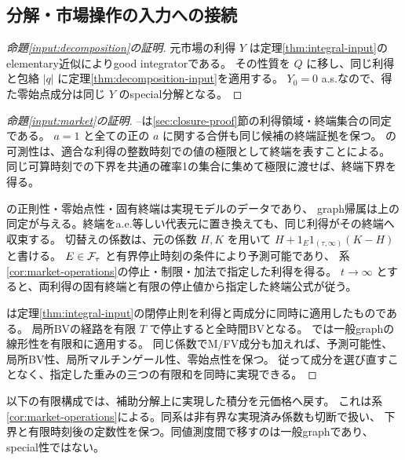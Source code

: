 \subsection{分解・市場操作の入力への接続}
\label{sec:auxiliary-transforms}
\begin{proof}[命題\ref{input:decomposition}の証明]
元市場の利得 $Y$ は定理\ref{thm:integral-input}のelementary近似によりgood integratorである。
その性質を $Q$ に移し、同じ利得と包絡 $|q|$ に定理\ref{thm:decomposition-input}を適用する。
$Y_0=0$ a.s.なので、得た零始点成分は同じ $Y$ のspecial分解となる。
\end{proof}

\begin{proof}[命題\ref{input:market}の証明]
--は\ref{sec:closure-proof}節の利得領域・終端集合の同定である。
$a=1$ と全ての正の $a$ に関する合併も同じ候補の終端証拠を保つ。
の可測性は、適合な利得の整数時刻での値の極限として終端を表すことによる。
同じ可算時刻での下界を共通の確率1の集合に集めて極限に渡せば、終端下界を得る。

の正則性・零始点性・固有終端は実現モデルのデータであり、
graph帰属は上の同定が与える。終端をa.e.等しい代表元に置き換えても、同じ利得がその終端へ収束する。
切替えの係数は、元の係数 $H,K$ を用いて
$H+1_E1_{(\tau,\infty)}(K-H)$ と書ける。
$E\in\mathcal F_\tau$ と有界停止時刻の条件により予測可能であり、
系\ref{cor:market-operations}の停止・制限・加法で指定した利得を得る。
$t\to\infty$ とすると、両利得の固有終端と有限の停止値から指定した終端公式が従う。

は定理\ref{thm:integral-input}の閉停止則を利得と両成分に同時に適用したものである。
局所BVの経路を有限 $T$ で停止すると全時間BVとなる。
では一般graphの線形性を有限和に適用する。
同じ係数でM/FV成分も加えれば、予測可能性、局所BV性、局所マルチンゲール性、零始点性を保つ。
従って成分を選び直すことなく、指定した重みの三つの有限和を同時に実現できる。
\end{proof}

以下の有限構成では、補助分解上に実現した積分を元価格へ戻す。
これは系\ref{cor:market-operations}による。同系は非有界な実現済み係数も切断で扱い、
下界と有限時刻後の定数性を保つ。同値測度間で移すのは一般graphであり、special性ではない。

